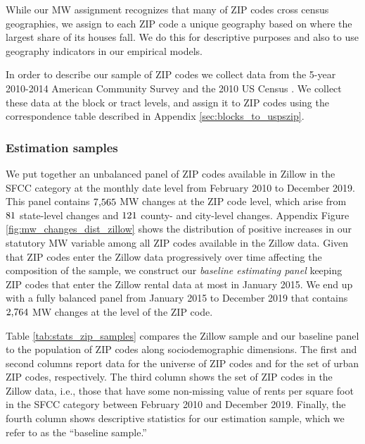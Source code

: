 While our MW assignment recognizes that many of ZIP codes cross census 
geographies, we assign to each ZIP code a unique geography based on where the 
largest share of its houses fall.
We do this for descriptive purposes and also to use geography indicators 
in our empirical models.

In order to describe our sample of ZIP codes we collect data from 
the 5-year 2010-2014 American Community Survey \parencite[ACS;][]{CensusACS} and
the 2010 US Census \parencite{CensusDecennial}.
We collect these data at the block or tract levels, and assign it to ZIP codes
using the correspondence table described in Appendix \ref{sec:blocks_to_uspszip}.

\subsubsection{Estimation samples}\label{sec:data_final_panel}

We put together an unbalanced panel of ZIP codes available in Zillow in the SFCC 
category at the monthly date level from February 2010 to December 2019.
This panel contains $\textnormal{7,565}$ MW changes at the ZIP code level, 
which arise from $\textnormal{81}$ state-level changes and 
$\textnormal{121}$ county- and city-level changes.
Appendix Figure \ref{fig:mw_changes_dist_zillow} shows the distribution of 
positive increases in our statutory MW variable among all ZIP codes available 
in the Zillow data.
Given that ZIP codes enter the Zillow data progressively over time affecting 
the composition of the sample,
we construct our \textit{baseline estimating panel} keeping ZIP codes that enter 
the Zillow rental data at most in January 2015.
We end up with a fully balanced panel from January 2015 to December 2019
that contains $\textnormal{2,764}$ MW changes at the level of the ZIP code.

Table \ref{tab:stats_zip_samples} compares the Zillow sample and our baseline 
panel to the population of ZIP codes along sociodemographic dimensions. 
The first and second columns report data for the universe of ZIP codes and 
for the set of urban ZIP codes, respectively.
The third column shows the set of ZIP codes in the Zillow data, i.e., those 
that have some non-missing value of rents per square foot in the SFCC category 
between February 2010 and December 2019.
Finally, the fourth column shows descriptive statistics for our estimation 
sample, which we refer to as the ``baseline sample.''

